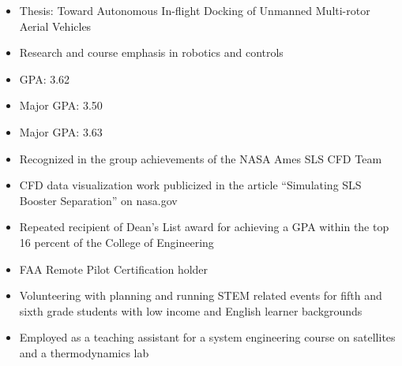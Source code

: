 
\begin{itemize}
  \item Thesis: Toward Autonomous In-flight Docking of Unmanned Multi-rotor Aerial Vehicles
  \item Research and course emphasis in robotics and controls
  \item GPA: 3.62
\end{itemize}
\divider

\begin{itemize}
  \item Major GPA: 3.50
\end{itemize}
\smallskip
{}
\begin{itemize}
  \item Major GPA: 3.63
\end{itemize}

\par\medskip
{}
\par\medskip
{}

\begin{itemize}
    \item Recognized in the group achievements of the NASA Ames SLS CFD Team
    \item CFD data visualization work publicized in the article “Simulating SLS Booster Separation” on nasa.gov
    \item Repeated recipient of Dean’s List award for achieving a GPA within the top 16 percent of the College of Engineering
\end{itemize}

\begin{itemize}
    \item FAA Remote Pilot Certification holder
    \item Volunteering with planning and running STEM related events for fifth and sixth grade students with low income and English learner backgrounds 
    \item Employed as a teaching assistant for a system engineering course on satellites and a thermodynamics lab
\end{itemize}
